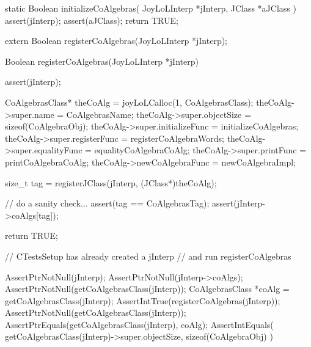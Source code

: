 \startCCode
static Boolean initializeCoAlgebras(
  JoyLoLInterp *jInterp,
  JClass   *aJClass
) {
  assert(jInterp);
  assert(aJClass);
  return TRUE;
}
\stopCCode

\startCHeader
extern Boolean registerCoAlgebras(JoyLoLInterp *jInterp);
\stopCHeader
{}

\startCCode
Boolean registerCoAlgebras(JoyLoLInterp *jInterp) {
  assert(jInterp);
  
  CoAlgebrasClass* theCoAlg    =
    joyLoLCalloc(1, CoAlgebrasClass);
  theCoAlg->super.name           = CoAlgebrasName;
  theCoAlg->super.objectSize     = sizeof(CoAlgebraObj);
  theCoAlg->super.initializeFunc = initializeCoAlgebras;
  theCoAlg->super.registerFunc   = registerCoAlgebraWords;
  theCoAlg->super.equalityFunc   = equalityCoAlgebraCoAlg;
  theCoAlg->super.printFunc      = printCoAlgebraCoAlg;
  theCoAlg->newCoAlgebraFunc     = newCoAlgebraImpl;
  
  size_t tag =
    registerJClass(jInterp, (JClass*)theCoAlg);

  // do a sanity check...
  assert(tag == CoAlgebrasTag);
  assert(jInterp->coAlgs[tag]);

  return TRUE;
}
\stopCCode


\startCTest
  // CTestsSetup has already created a jInterp
  // and run registerCoAlgebras
  
  AssertPtrNotNull(jInterp);
  AssertPtrNotNull(jInterp->coAlgs);
  AssertPtrNotNull(getCoAlgebrasClass(jInterp));
  CoAlgebrasClass *coAlg =
    getCoAlgebrasClass(jInterp);
  AssertIntTrue(registerCoAlgebras(jInterp));
  AssertPtrNotNull(getCoAlgebrasClass(jInterp));
  AssertPtrEquals(getCoAlgebrasClass(jInterp), coAlg);
  AssertIntEquals(
    getCoAlgebrasClass(jInterp)->super.objectSize,
    sizeof(CoAlgebraObj)
  )
\stopCTest
\stopTestCase
\stopTestSuite
